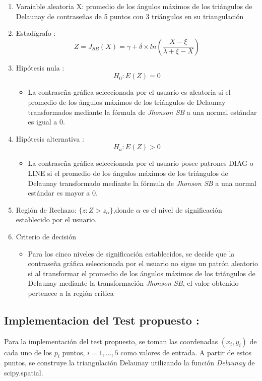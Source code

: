 \documentclass[12pt]{report}
\begin{document}
\begin{enumerate}
	\item Varaiable aleatoria X: promedio de los ángulos máximos de los triángulos de Delaunay de contraseñas de 5 puntos con 3 triángulos en su triangulación
	\item Estadígrafo : \[
	Z= J_{SB}(X) =  \gamma + \delta \times ln\left(\frac{X - \xi}{\lambda + \xi - X}\right)
	\]

	\item Hipótesis nula : \[H_0:E(Z)=0\]
	\begin{itemize}
		\item La contraseña gráfica seleccionada por el usuario es aleatoria si el promedio de los ángulos máximos de los triángulos de Delaunay  transformados mediante la fórmula de \textit{Jhonson SB} a una normal estándar es igual a 0.
	\end{itemize}
	
	
	\item Hipótesis alternativa : \[H_a:E(Z)>0\]
			\begin{itemize}
			\item La contraseña gráfica seleccionada por el usuario posee patrones DIAG o LINE  si el promedio de los ángulos máximos de los triángulos de Delaunay  transformado mediante la fórmula de \textit{Jhonson SB} a una normal estándar es mayor a 0.
		\end{itemize}
	
	\item  Región de Rechazo: $\{z:Z>z_\alpha\}$,donde $\alpha$ es el nivel de significación establecido por el usuario. 
	
	\item Criterio de decisión
	\begin{itemize}
		\item Para los cinco niveles de significación establecidos, se decide que la contraseña gráfica seleccionada por el usuario no sigue un patrón aleatorio si al transformar el promedio de los ángulos máximos de los triángulos de Delaunay mediante la transformación \textit{Jhonson SB}, el valor obtenido pertenece a la región crítica 
	\end{itemize}
	\end{enumerate}	 

\subsection{Implementacion del Test propuesto :}
Para la implementación del test propuesto, se toman las coordenadas \((x_i, y_i)\) de cada uno de los \(p_i\) puntos, \(i = 1, \ldots, 5\) como valores de entrada. A partir de estos puntos, se construye la triangulación Delaunay utilizando la función \textit{Delaunay} de scipy.spatial.
\end{document}

